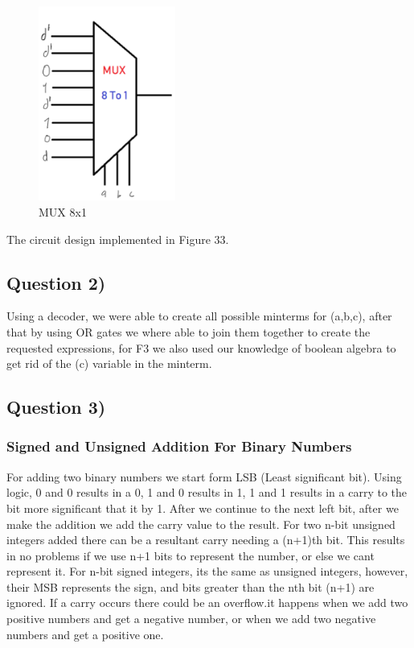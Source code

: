 \documentclass[pdftex,12pt,a4paper]{article}
\begin{document}
   \begin{figure}[H]
    	\centering
    	\includegraphics[width=0.4\textwidth]{preliminary/mux_prelim_1.png}	
    	\caption{MUX 8x1}
    	\label{MUX 8x1}
    \end{figure}

 The circuit design implemented in Figure 33.

\subsection{Question 2)}
Using a decoder, we were able to create all possible minterms for (a,b,c), after that by using OR gates we where able to join them together to create the requested expressions, for F3 we also used our knowledge of boolean algebra to get rid of the (c) variable in the minterm.
    
\subsection{Question 3)}
    \subsubsection{Signed and Unsigned Addition For Binary Numbers}
    For adding two binary numbers we start form LSB (Least significant bit). Using logic, 0 and 0 results in a 0, 1 and 0 results in 1, 1 and 1 results in a carry to the bit more significant that it by 1.
    After we continue to the next left bit, after we make the addition we add the carry value to the result. For two n-bit unsigned integers added there can be a resultant carry needing a (n+1)th bit. This results in no problems if we use n+1 bits to represent the number, or else we cant represent it.
    For n-bit signed integers, its the same as unsigned integers, however, their MSB represents the sign, and bits greater than the nth bit (n+1) are ignored. If a carry occurs there could be an overflow.it happens when we add two positive numbers and get a negative number, or when we add two negative numbers and get a positive one.
    
\end{document}
